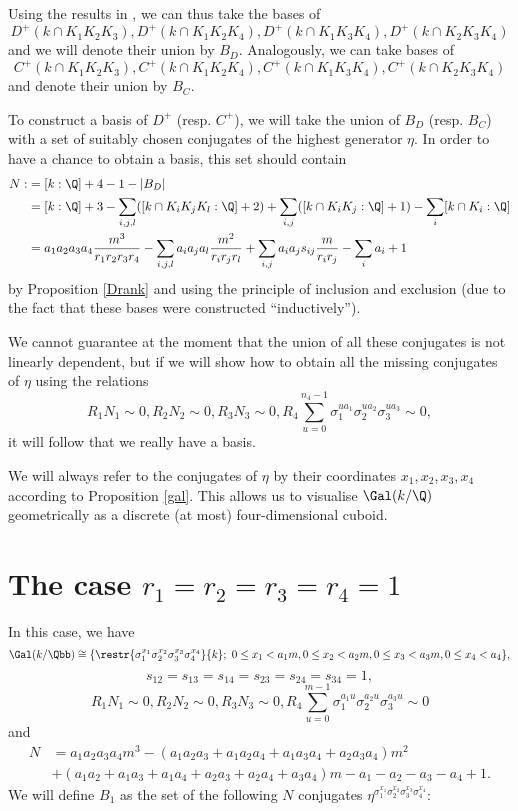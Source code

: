 Using the results in \citep{Kucera2016}, we can thus take the bases of $$D^+(k\cap K_1K_2K_3),D^+(k\cap K_1K_2K_4),D^+(k\cap K_1K_3K_4),D^+(k\cap K_2K_3K_4)$$
and we will denote their union by $B_D$. Analogously, we can take bases of $$C^+(k\cap K_1K_2K_3),C^+(k\cap K_1K_2K_4),C^+(k\cap K_1K_3K_4),C^+(k\cap K_2K_3K_4)$$
and denote their union by $B_C$.

To construct a basis of $D^+$ (resp. $C^+$), we will take the union of $B_D$ (resp. $B_C$) with a set of suitably chosen conjugates of the highest generator $\eta$. In order to have a chance to obtain a basis, this set should contain
\begin{equation*}
\begin{split}
N:&=[k:\Q]+4-1-|B_D|\\
&=[k:\Q]+3-\sum_{i,j,l}([k\cap K_iK_jK_l:\Q]+2)+\sum_{i,j}([k\cap K_iK_j:\Q]+1)-\sum_{i}[k\cap K_i:\Q]\\
&=a_1a_2a_3a_4\frac{m^3}{r_1r_2r_3r_4}-\sum_{i,j,l}a_ia_ja_l\frac{m^2}{r_ir_jr_l}+\sum_{i,j}
a_ia_js_{ij}\frac{m}{r_ir_j}-\sum_{i}a_i+1
\end{split}
\end{equation*}
by Proposition \ref{Drank} and using the principle of inclusion and exclusion (due to the fact that these bases were constructed \enquote{inductively}).

We cannot guarantee at the moment that the union of all these conjugates is not linearly dependent, but if we will show how to obtain all the missing conjugates of $\eta$ using the relations $$R_1N_1\sim 0, R_2N_2\sim 0, R_3N_3\sim 0, R_4\sum_{u=0}^{n_4-1}\sigma_1^{ua_1}\sigma_2^{ua_2}\sigma_3^{ua_3}\sim 0,$$
it will follow that we really have a basis.

We will always refer to the conjugates of $\eta$ by their coordinates $x_1,x_2,x_3,x_4$ according to Proposition \ref{gal}. This allows us to visualise $\Gal(k/\Q)$ geometrically as a discrete (at most) four-dimensional cuboid.
\section{The case $r_1=r_2=r_3=r_4=1$}
In this case, we have
$$\Gal(k/\Qbb)\cong
 \{\restr{\sigma_1^{x_1}\sigma_2^{x_2}\sigma_3^{x_3}\sigma_4^{x_4}}{k};~  0\leq x_1<a_1m, 0\leq x_2<a_2m, 0\leq x_3<a_3m,0\leq x_4<a_4\},$$
 $$s_{12}=s_{13}=s_{14}=s_{23}=s_{24}=s_{34}=1,$$
$$R_1N_1\sim 0, R_2N_2\sim 0, R_3N_3 \sim 0, R_4 \sum_{u=0}^{m-1}\sigma_1^{a_1u}\sigma_2^{a_2u}\sigma_3^{a_3u} \sim 0$$
and
\begin{align*}
N&=a_1a_2a_3a_4m^3-(a_1a_2a_3+a_1a_2a_4+a_1a_3a_4+a_2a_3a_4)m^2\\
&+(a_1a_2+a_1a_3+a_1a_4+a_2a_3+a_2a_4+a_3a_4)m-a_1-a_2-a_3-a_4+1.
\end{align*}
We will define $B_1$ as the set of the following $N$ conjugates $\eta^{\sigma_1^{x_1}\sigma_2^{x_2}\sigma_3^{x_3}\sigma_4^{x_4}}$:

